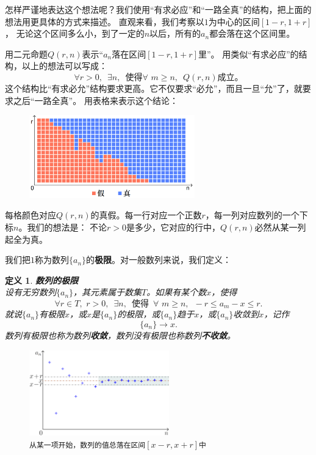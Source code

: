 \documentclass[12pt,UTF8]{ctexbook}
\newtheorem{df}{定义}[section]
\begin{document}
怎样严谨地表达这个想法呢？我们使用“有求必应”和“一路全真”的结构，把上面的想法用更具体的方式来描述。
直观来看，我们考察以$1$为中心的区间$[1-r,1+r]$，
无论这个区间多么小，到了一定的$n$以后，所有的$a_n$都会落在这个区间里。

用二元命题$Q(r, n)$表示“$a_n$落在区间$[1-r,1+r]$里”。
用类似“有求必应”的结构，以上的想法可以写成：
$$\forall r > 0, \,\,\, \exists n,  \,\,\, \mbox{使得} \forall \,\, m \geqslant n, \,\,\, Q(r, n)\mbox{成立。}$$
这个结构比“有求必允”结构要求更高。它不仅要求“必允”，而且一旦“允”了，就要求之后“一路全真”。
用表格来表示这个结论：

\begin{figure}[h] %
    \centering
    \includegraphics[width=0.64\textwidth]{tu/数列极限2.png}
\end{figure}

每格颜色对应$Q(r, n)$的真假。每一行对应一个正数$r$，每一列对应数列的一个下标$n$。我们的想法是：
不论$r>0$是多少，它对应的行中，$Q(r, n)$必然从某一列起全为真。

我们把$1$称为数列$\{a_n\}$的\textbf{极限}。对一般数列来说，我们定义：
\begin{df}\textbf{数列的极限} \\
设有无穷数列$\{a_n\}$，其元素属于数集$T$。如果有某个数$x$，使得
$$ \forall r\in T, \,\, r > 0, \,\,\, \exists n,  \,\,\, \mbox{使得} \,\,\, \forall \,\, m \geqslant n, \,\,\, - r \leqslant a_m - x \leqslant r. $$
就说$\{a_n\}$有极限$x$，或$x$是$\{a_n\}$的极限，或$\{a_n\}$趋于$x$，或$\{a_n\}$收敛到$x$，记作
$$\{a_n\} \to x.$$
数列有极限也称为数列\textbf{收敛}，数列没有极限也称数列\textbf{不收敛}。
\end{df}

\begin{figure}[h] %
    \vspace{-14pt}
    \centering
    \includegraphics[width=0.54\textwidth]{tu/数列极限1.png}
    \caption*{\texttt{从某一项开始，数列的值总落在区间}$[x-r,x+r]$\texttt{中}}
\end{figure}
\end{document}
